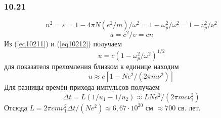 \subsubsection*{10.21}
\begin{equation}\label{eq10211}
	n^2 = \varepsilon = 1 - 4 \pi N (e^2 / m) / \omega^2 = 1 - \omega_p^2 / \omega^2 = 1 - \nu_p^2 / \nu^2
\end{equation}
\begin{equation}\label{eq10212}
	u  = c^2 / \upsilon = cn
\end{equation}
Из (\ref{eq10211}) и (\ref{eq10212}) получаем
\begin{equation*}
	u = c(1 - \omega_p^2 / \omega^2)^{1/2}
\end{equation*}
для показателя преломления близком к единице находим
\begin{equation*}
	u \approx c \left[1 - Ne^2 / (2\pi m \nu^2)\right]
\end{equation*}
Для разницы времён прихода импульсов получаем
\begin{equation*}
	\Delta t = L(1/u_1 - 1/u_2) \approx LNe^2 / (2\pi mc  \nu_1^2)
\end{equation*}
Отсюда $L = 2\pi cm \nu_1^2 \Delta t / (Ne^2) \approx 6,67 \cdot 10^{20}$ см $\approx 700$ св. лет.